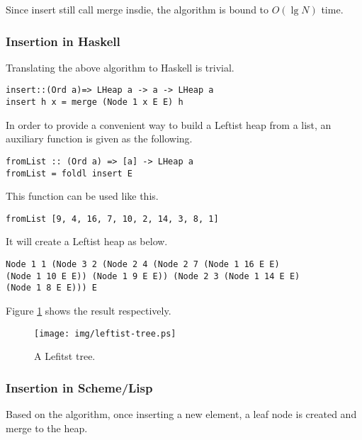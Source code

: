 \documentclass{article}
\begin{document}
Since insert still call merge insdie, the algorithm is bound to $O(\lg N)$
time.

\subsubsection*{Insertion in Haskell}

Translating the above algorithm to Haskell is trivial.

\lstset{language=Haskell}
\begin{lstlisting}
insert::(Ord a)=> LHeap a -> a -> LHeap a
insert h x = merge (Node 1 x E E) h
\end{lstlisting}

In order to provide a convenient way to build a Leftist heap from
a list, an auxiliary function is given as the following.

\begin{lstlisting}
fromList :: (Ord a) => [a] -> LHeap a
fromList = foldl insert E
\end{lstlisting}

This function can be used like this.

\begin{lstlisting}
fromList [9, 4, 16, 7, 10, 2, 14, 3, 8, 1]
\end{lstlisting}

It will create a Leftist heap as below.

\begin{verbatim}
Node 1 1 (Node 3 2 (Node 2 4 (Node 2 7 (Node 1 16 E E) 
(Node 1 10 E E)) (Node 1 9 E E)) (Node 2 3 (Node 1 14 E E) 
(Node 1 8 E E))) E
\end{verbatim}

Figure \ref{fig:leftist-tree} shows the result respectively.

\begin{figure}[htbp]
   \begin{center}
   	  \texttt{[image: img/leftist-tree.ps]}
    \caption{A Lefitst tree.} \label{fig:leftist-tree}
   \end{center}
\end{figure}

\subsubsection*{Insertion in Scheme/Lisp}

Based on the algorithm, once inserting a new element, a leaf node 
is created and merge to the heap.
\end{document}
